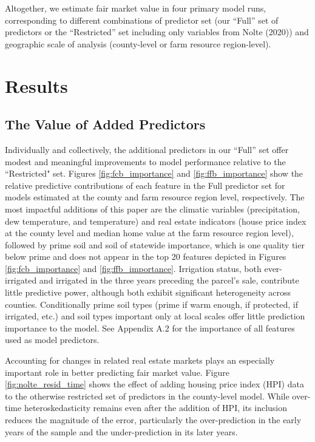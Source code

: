 \documentclass[12pt]{article}
\begin{document}
Altogether, we estimate fair market value in four primary model runs, corresponding to different combinations of predictor set (our ``Full'' set of predictors or the ``Restricted'' set including only variables from Nolte (2020)) and geographic scale of analysis (county-level or farm resource region-level). 

\section{Results}

\subsection{The Value of Added Predictors}

Individually and collectively, the additional predictors in our ``Full'' set offer modest and meaningful improvements to model performance relative to the ``Restricted" set. Figures \ref{fig:fcb_importance} and \ref{fig:ffb_importance} show the relative predictive contributions of each feature in the Full predictor set for models estimated at the county and farm resource region level, respectively. The most impactful additions of this paper are the climatic variables (precipitation, dew temperature, and temperature) and real estate indicators (house price index at the county level and median home value at the farm resource region level), followed by prime soil and soil of statewide importance, which is one quality tier below prime and does not appear in the top 20 features depicted in Figures \ref{fig:fcb_importance} and \ref{fig:ffb_importance}. Irrigation status, both ever-irrigated and irrigated in the three years preceding the parcel's sale, contribute little predictive power, although both exhibit significant heterogeneity across counties. Conditionally prime soil types (prime if warm enough, if protected, if irrigated, etc.) and soil types important only at local scales offer little prediction importance to the model. See Appendix A.2 for the importance of all features used as model predictors.

Accounting for changes in related real estate markets plays an especially important role in better predicting fair market value. Figure \ref{fig:nolte_resid_time} shows the effect of adding housing price index (HPI) data to the otherwise restricted set of predictors in the county-level model. While over-time heteroskedasticity remains even after the addition of HPI, its inclusion reduces the magnitude of the error, particularly the over-prediction in the early years of the sample and the under-prediction in its later years.
\end{document}
